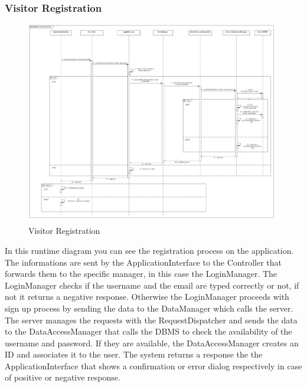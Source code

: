 \subsubsection{Visitor Registration}
\begin{figure}[H]
\centering
\includegraphics[scale=0.25]{images/VisitorRegistration}
\caption{Visitor Registration}
\end{figure}In this runtime diagram you can see the registration process on the application. The informations are sent by the ApplicationInterface to the Controller that forwards them to the specific manager, in this case the LoginManager. The LoginManager checks if the username and the email are typed correctly or not, if not it returns a negative response. Otherwise the LoginManager proceeds with sign up process by sending the data to the DataManager which calls the server. The server manages the requests with the RequestDispatcher and sends the data to the DataAccessManager that calls the DBMS to check the availability of the username and password. If they are available, the DataAccessManager creates an ID and associates it to the user. The system returns a response the the ApplicationInterface that shows a confirmation or error dialog respectively in case of positive or negative response.

